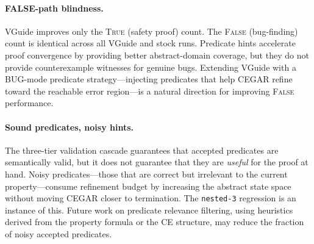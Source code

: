 \paragraph{FALSE-path blindness.} VGuide improves only the \textsc{True} (safety
proof) count. The \textsc{False} (bug-finding) count is identical across all VGuide
and stock runs. Predicate hints accelerate proof convergence by providing better
abstract-domain coverage, but they do not provide counterexample witnesses for genuine
bugs. Extending VGuide with a BUG-mode predicate strategy---injecting predicates that
help CEGAR refine toward the reachable error region---is a natural direction for
improving \textsc{False} performance.

\paragraph{Sound predicates, noisy hints.} The three-tier validation cascade guarantees
that accepted predicates are semantically valid, but it does not guarantee that they
are \emph{useful} for the proof at hand. Noisy predicates---those that are correct but
irrelevant to the current property---consume refinement budget by increasing the
abstract state space without moving CEGAR closer to termination. The \texttt{nested-3}
regression is an instance of this. Future work on predicate relevance filtering, using
heuristics derived from the property formula or the CE structure, may reduce the
fraction of noisy accepted predicates.
